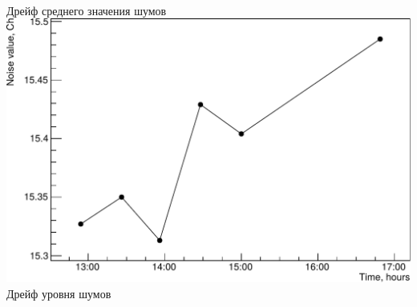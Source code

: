 \documentclass[14pt]{beamer}
\begin{document}
\begin{frame}[c]
\begin{columns}
\begin{minipage}[t][1\textheight]{\linewidth}
\begin{center}
	\\ \hspace{10pt}\tiny{Дрейф среднего значения шумов}\\
	\vspace{5pt}
	\includegraphics[width=0.7\linewidth]{Noise_time_drift.pdf}
	\\ \hspace{10pt}\tiny{Дрейф уровня шумов}

	\end{center}
	
	\end{minipage}
\end{columns}
\end{frame}
\end{document}
